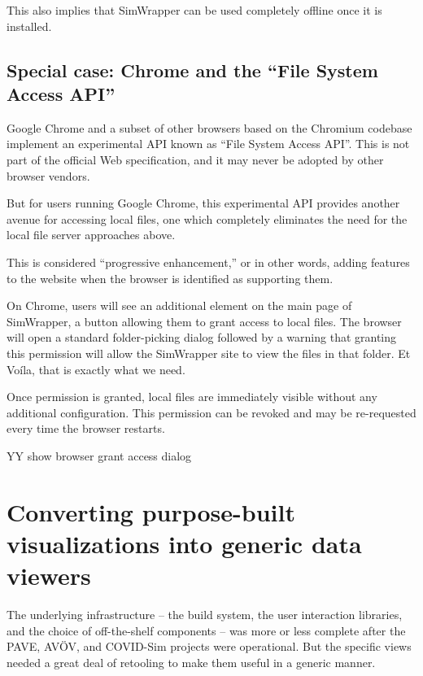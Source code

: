 This also implies that SimWrapper can be used completely offline once it
is installed.

\hypertarget{special-case-chrome-and-the-file-system-access-api}{%
\subsection{Special case: Chrome and the ``File System Access
API''}\label{special-case-chrome-and-the-file-system-access-api}}

Google Chrome and a subset of other browsers based on the Chromium
codebase implement an experimental API known as ``File System Access
API''. This is not part of the official Web specification, and it may
never be adopted by other browser vendors.

But for users running Google Chrome, this experimental API provides
another avenue for accessing local files, one which completely
eliminates the need for the local file server approaches above.

This is considered ``progressive enhancement,'' or in other words,
adding features to the website when the browser is identified as
supporting them.

On Chrome, users will see an additional element on the main page of
SimWrapper, a button allowing them to grant access to local files. The
browser will open a standard folder-picking dialog followed by a warning
that granting this permission will allow the SimWrapper site to view the
files in that folder. Et Voíla, that is exactly what we need.

Once permission is granted, local files are immediately visible without
any additional configuration. This permission can be revoked and may be
re-requested every time the browser restarts.

YY show browser grant access dialog

\hypertarget{converting-purpose-built-visualizations-into-generic-data-viewers}{%
\section{Converting purpose-built visualizations into generic data
viewers}\label{converting-purpose-built-visualizations-into-generic-data-viewers}}

The underlying infrastructure -- the build system, the user interaction
libraries, and the choice of off-the-shelf components -- was more or
less complete after the PAVE, AVÖV, and COVID-Sim projects were
operational. But the specific views needed a great deal of retooling to
make them useful in a generic manner.

